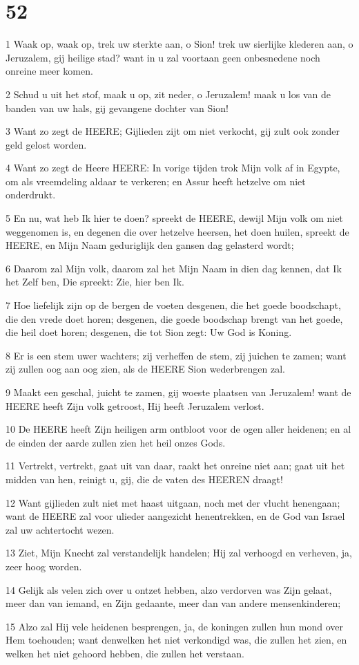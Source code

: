 \chapter{52}

\par 1 Waak op, waak op, trek uw sterkte aan, o Sion! trek uw sierlijke klederen aan, o Jeruzalem, gij heilige stad? want in u zal voortaan geen onbesnedene noch onreine meer komen.
\par 2 Schud u uit het stof, maak u op, zit neder, o Jeruzalem! maak u los van de banden van uw hals, gij gevangene dochter van Sion!
\par 3 Want zo zegt de HEERE; Gijlieden zijt om niet verkocht, gij zult ook zonder geld gelost worden.
\par 4 Want zo zegt de Heere HEERE: In vorige tijden trok Mijn volk af in Egypte, om als vreemdeling aldaar te verkeren; en Assur heeft hetzelve om niet onderdrukt.
\par 5 En nu, wat heb Ik hier te doen? spreekt de HEERE, dewijl Mijn volk om niet weggenomen is, en degenen die over hetzelve heersen, het doen huilen, spreekt de HEERE, en Mijn Naam geduriglijk den gansen dag gelasterd wordt;
\par 6 Daarom zal Mijn volk, daarom zal het Mijn Naam in dien dag kennen, dat Ik het Zelf ben, Die spreekt: Zie, hier ben Ik.
\par 7 Hoe liefelijk zijn op de bergen de voeten desgenen, die het goede boodschapt, die den vrede doet horen; desgenen, die goede boodschap brengt van het goede, die heil doet horen; desgenen, die tot Sion zegt: Uw God is Koning.
\par 8 Er is een stem uwer wachters; zij verheffen de stem, zij juichen te zamen; want zij zullen oog aan oog zien, als de HEERE Sion wederbrengen zal.
\par 9 Maakt een geschal, juicht te zamen, gij woeste plaatsen van Jeruzalem! want de HEERE heeft Zijn volk getroost, Hij heeft Jeruzalem verlost.
\par 10 De HEERE heeft Zijn heiligen arm ontbloot voor de ogen aller heidenen; en al de einden der aarde zullen zien het heil onzes Gods.
\par 11 Vertrekt, vertrekt, gaat uit van daar, raakt het onreine niet aan; gaat uit het midden van hen, reinigt u, gij, die de vaten des HEEREN draagt!
\par 12 Want gijlieden zult niet met haast uitgaan, noch met der vlucht henengaan; want de HEERE zal voor ulieder aangezicht henentrekken, en de God van Israel zal uw achtertocht wezen.
\par 13 Ziet, Mijn Knecht zal verstandelijk handelen; Hij zal verhoogd en verheven, ja, zeer hoog worden.
\par 14 Gelijk als velen zich over u ontzet hebben, alzo verdorven was Zijn gelaat, meer dan van iemand, en Zijn gedaante, meer dan van andere mensenkinderen;
\par 15 Alzo zal Hij vele heidenen besprengen, ja, de koningen zullen hun mond over Hem toehouden; want denwelken het niet verkondigd was, die zullen het zien, en welken het niet gehoord hebben, die zullen het verstaan.

